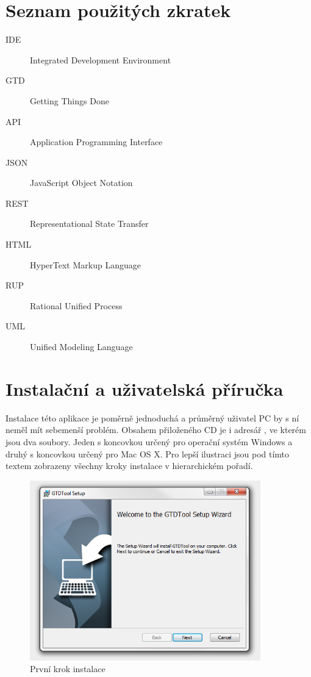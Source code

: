 \documentclass[11pt,oneside,a4paper]{book}
\begin{document}
\chapter{Seznam použitých zkratek}

\begin{description}
\item[IDE] Integrated Development Environment
\item[GTD] Getting Things Done
\item[API] Application Programming Interface
\item[JSON] JavaScript Object Notation
\item[REST] Representational State Transfer
\item[HTML] HyperText Markup Language
\item[RUP] Rational Unified Process
\item[UML] Unified Modeling Language
\end{description}

\chapter{Instalační a uživatelská příručka}
Instalace této aplikace je poměrně jednoduchá a průměrný uživatel PC by s ní neměl mít sebemenší problém. Obsahem přiloženého CD je i adresář , ve kterém jsou dva soubory. Jeden s koncovkou  určený pro operační systém Windows a druhý s koncovkou  určený pro Mac OS X. Pro lepší ilustraci jsou pod tímto textem zobrazeny všechny kroky instalace v hierarchickém pořadí.

\begin{figure}[h]
	\begin{center}
		\includegraphics[width=10cm]{figures/install/01.png}
		\caption{První krok instalace}
		\label{fig:install-01}
	\end{center}
\end{figure}
\end{document}
